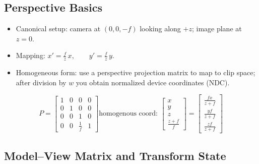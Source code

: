 \documentclass[8pt,twocolumn]{extarticle}
\begin{document}
\subsection*{Perspective Basics}
\begin{itemize}
  \item Canonical setup: camera at \((0,0,-f)\) looking along \(+z\); image plane at \(z=0\).
  \item Mapping:
  $
    x'=\frac{f}{z}\,x,\qquad y'=\frac{f}{z}\,y.
  $
  \item Homogeneous form: use a perspective projection matrix to map to clip space; after division by \(w\) you obtain normalized device coordinates (NDC).
\end{itemize}
\[P = \begin{bmatrix}
  1 & 0 & 0 & 0 \\
  0 & 1 & 0 & 0 \\
  0 & 0 & 1 & 0 \\
  0 & 0 & \frac{1}{f} & 1
  \end{bmatrix} \text{homogenous coord: }\begin{bmatrix}
    x \\ y \\ z\\ \frac{z+f}{f}
  \end{bmatrix} = \begin{bmatrix}
    \frac{fx}{z+f}\\ \frac{yf}{z+f}\\ \frac{zf}{z+f}
  \end{bmatrix}\]
  \subsection{Model--View Matrix and Transform State}
\end{document}

